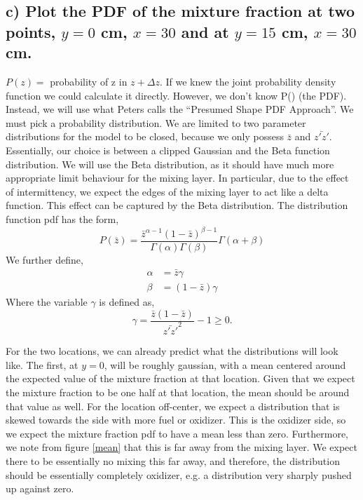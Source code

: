 \documentclass{article}
\begin{document}
\subsection*{c) Plot the PDF of the mixture fraction at two points, $y=0$ cm,
$x=30$ and at $y=15$ cm, $x=30$ cm.}

$P(z) =$ probability of z in $z+\Delta z$. If we knew the joint probability density function
we could calculate it directly. However, we don't know P() (the PDF). Instead, we will use 
what Peters calls the ``Presumed Shape PDF Approach''. We must pick a probability distribution. 
We are limited to two parameter distributions for the model to be closed, because we only possess 
$\bar z$ and $\bar{z'z'}$. Essentially, our choice is between a clipped Gaussian and the Beta 
function distribution. We will use the Beta distribution, as it should have much more appropriate 
limit behaviour for the mixing layer. In particular, due to the effect of intermittency, we expect the 
edges of the mixing layer to act like a delta function. This effect can be captured by the Beta distribution. 
The distribution function pdf has the form, 
\begin{equation}
P(\bar z) = \frac{\bar z^{\alpha-1}(1-\bar z)^{\beta-1}}{\Gamma(\alpha)\Gamma(\beta)}\Gamma(\alpha + \beta)
\end{equation}
We further define,
\begin{align}
\alpha &= \bar z \gamma \\
\beta  &= (1-\bar z) \gamma
\end{align}
Where the variable $\gamma$ is defined as, 
\begin{equation}
  \gamma = \frac{\bar z (1-\bar z)}{\bar{z'z'}^2} -1 \geq 0.
\end{equation}

For the two locations, we can already predict what the distributions
will look like. The first, at $y=0$, will be roughly gaussian, with a
mean centered around the expected value of the mixture fraction at that
location. Given that we expect the mixture fraction to be one half at that
location, the mean should be around that value as well. For the location
off-center, we expect a distribution that is skewed towards the side
with more fuel or oxidizer. This is the oxidizer side, so we expect the
mixture fraction pdf to have a mean less than zero. Furthermore, we note
from figure \ref{mean} that this is far away from the mixing layer. We
expect there to be essentially no mixing this far away, and therefore,
the distribution should be essentially completely oxidizer, e.g. a
distribution very sharply pushed up against zero. 
\end{document}
